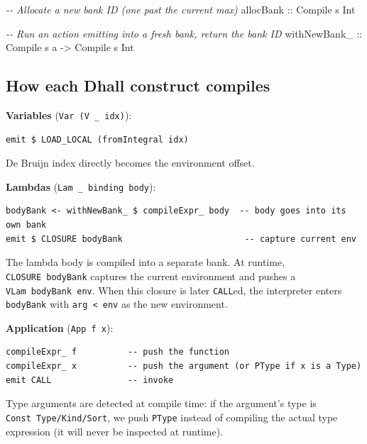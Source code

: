\documentclass[]{article}
\newenvironment{Shaded}{}{}
\newcommand{\CommentTok}[1]{\textcolor[rgb]{0.38,0.63,0.69}{\textit{#1}}}
\newcommand{\DataTypeTok}[1]{\textcolor[rgb]{0.56,0.13,0.00}{#1}}
\newcommand{\NormalTok}[1]{#1}
\newcommand{\OtherTok}[1]{\textcolor[rgb]{0.00,0.44,0.13}{#1}}
\begin{document}
\begin{Shaded}
\begin{Highlighting}[]
\CommentTok{{-}{-} Allocate a new bank ID (one past the current max)}
\OtherTok{allocBank ::} \DataTypeTok{Compile}\NormalTok{ s }\DataTypeTok{Int}

\CommentTok{{-}{-} Run an action emitting into a fresh bank, return the bank ID}
\OtherTok{withNewBank\_ ::} \DataTypeTok{Compile}\NormalTok{ s a }\OtherTok{{-}\textgreater{}} \DataTypeTok{Compile}\NormalTok{ s }\DataTypeTok{Int}
\end{Highlighting}
\end{Shaded}

\subsection{How each Dhall construct
compiles}\label{how-each-dhall-construct-compiles}

\textbf{Variables} (\texttt{Var\ (V\ \_\ idx)}):

\begin{verbatim}
emit $ LOAD_LOCAL (fromIntegral idx)
\end{verbatim}

De Bruijn index directly becomes the environment offset.

\textbf{Lambdas} (\texttt{Lam\ \_\ binding\ body}):

\begin{verbatim}
bodyBank <- withNewBank_ $ compileExpr_ body  -- body goes into its own bank
emit $ CLOSURE bodyBank                        -- capture current env
\end{verbatim}

The lambda body is compiled into a separate bank. At runtime,
\texttt{CLOSURE\ bodyBank} captures the current environment and pushes a
\texttt{VLam\ bodyBank\ env}. When this closure is later \texttt{CALL}ed, the
interpreter enters \texttt{bodyBank} with
\texttt{arg\ \textless{}\textbar{}\ env} as the new environment.

\textbf{Application} (\texttt{App\ f\ x}):

\begin{verbatim}
compileExpr_ f          -- push the function
compileExpr_ x          -- push the argument (or PType if x is a Type)
emit CALL               -- invoke
\end{verbatim}

Type arguments are detected at compile time: if the argument's type is
\texttt{Const\ Type/Kind/Sort}, we push \texttt{PType} instead of compiling the
actual type expression (it will never be inspected at runtime).
\end{document}
